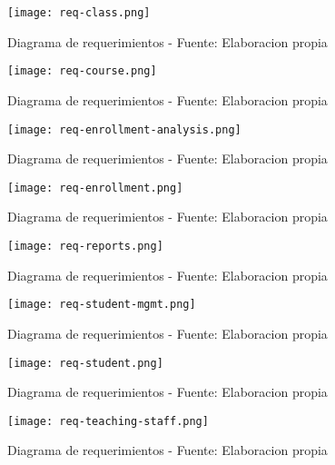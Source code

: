 \begin{figure}
    \texttt{[image: req-class.png]}
    \caption{Diagrama de requerimientos - Fuente: Elaboracion propia}\label{fig:req-class}
\end{figure}
\begin{figure}[htbp]
    \texttt{[image: req-course.png]}
    \caption{Diagrama de requerimientos - Fuente: Elaboracion propia}\label{fig:req-course}
\end{figure}
\begin{figure}
    \texttt{[image: req-enrollment-analysis.png]}
    \caption{Diagrama de requerimientos - Fuente: Elaboracion propia}\label{fig:req-enrollment-analysis}
\end{figure}
\begin{figure}
    \texttt{[image: req-enrollment.png]}
    \caption{Diagrama de requerimientos - Fuente: Elaboracion propia}\label{fig:req-enrollment}
\end{figure}
\begin{figure}
    \texttt{[image: req-reports.png]}
    \caption{Diagrama de requerimientos - Fuente: Elaboracion propia}\label{fig:req-reports}
\end{figure}
\begin{figure}
    \texttt{[image: req-student-mgmt.png]}
    \caption{Diagrama de requerimientos - Fuente: Elaboracion propia}\label{fig:req-student-mgmt}
\end{figure}
\begin{figure}
    \texttt{[image: req-student.png]}
    \caption{Diagrama de requerimientos - Fuente: Elaboracion propia}\label{fig:req-student}
\end{figure}
\begin{figure}
    \texttt{[image: req-teaching-staff.png]}
    \caption{Diagrama de requerimientos - Fuente: Elaboracion propia}\label{fig:req-teaching-staff}
\end{figure}

